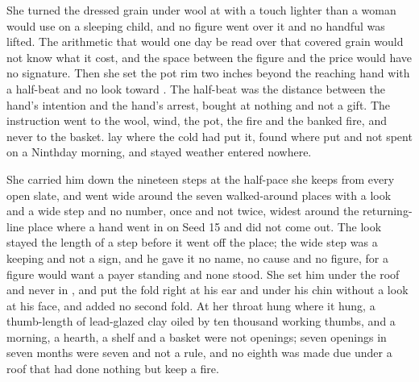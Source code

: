 She turned the dressed grain under wool at  with a touch lighter than a woman would use on a sleeping child, and no figure went over it and no handful was lifted. The arithmetic that would one day be read over that covered grain would not know what it cost, and the space between the figure and the price would have no signature. Then she set the pot rim two inches beyond the reaching hand with a half-beat and no look toward . The half-beat was the distance between the hand's intention and the hand's arrest, bought at nothing and not a gift. The instruction went to the wool,  wind, the pot, the fire and the banked fire, and never to the basket.  lay where the cold had put it, found where put and not spent on a Ninthday morning, and  stayed weather entered nowhere.

She carried him down the nineteen steps at the half-pace she keeps from every open slate, and went wide around the seven walked-around places with a look and a wide step and no number, once and not twice, widest around the returning-line place where a hand went in on Seed 15 and did not come out. The look stayed the length of a step before it went off the place; the wide step was a keeping and not a sign, and he gave it no name, no cause and no figure, for a figure would want a payer standing and none stood. She set him under the roof and never in , and put the fold right at his ear and under his chin without a look at his face, and added no second fold. At her throat  hung where it hung, a thumb-length of lead-glazed clay oiled by ten thousand working thumbs, and a morning, a hearth, a shelf and a basket were not openings; seven openings in seven months were seven and not a rule, and no eighth was made due under a roof that had done nothing but keep a fire.

\scenebreak

